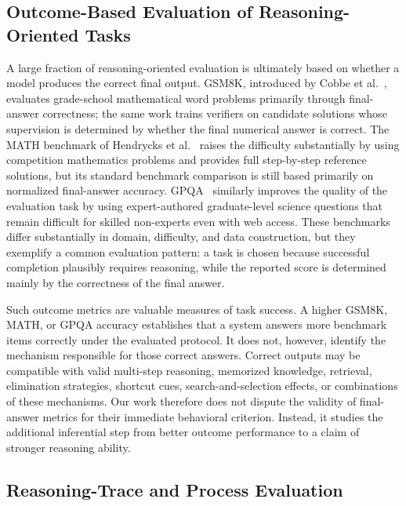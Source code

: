 \documentclass[acmsmall,screen,review,anonymous]{acmart}
\begin{document}
\subsection{Outcome-Based Evaluation of Reasoning-Oriented Tasks}
\label{sec:rw-outcome}

A large fraction of reasoning-oriented evaluation is ultimately based on
whether a model produces the correct final output. GSM8K, introduced by
Cobbe et al.~\cite{Cobbe2021GSM8K}, evaluates grade-school mathematical word
problems primarily through final-answer correctness; the same work trains
verifiers on candidate solutions whose supervision is determined by whether
the final numerical answer is correct. The MATH benchmark of Hendrycks et
al.~\cite{Hendrycks2021MATH} raises the difficulty substantially by using
competition mathematics problems and provides full step-by-step reference
solutions, but its standard benchmark comparison is still based primarily on
normalized final-answer accuracy. GPQA~\cite{Rein2024GPQA} similarly improves
the quality of the evaluation task by using expert-authored graduate-level
science questions that remain difficult for skilled non-experts even with web
access. These benchmarks differ substantially in domain, difficulty, and data
construction, but they exemplify a common evaluation pattern: a task is chosen
because successful completion plausibly requires reasoning, while the reported
score is determined mainly by the correctness of the final answer.

Such outcome metrics are valuable measures of task success. A higher GSM8K,
MATH, or GPQA accuracy establishes that a system answers more benchmark items
correctly under the evaluated protocol. It does not, however, identify the
mechanism responsible for those correct answers. Correct outputs may be
compatible with valid multi-step reasoning, memorized knowledge, retrieval,
elimination strategies, shortcut cues, search-and-selection effects, or
combinations of these mechanisms. Our work therefore does not dispute the
validity of final-answer metrics for their immediate behavioral criterion.
Instead, it studies the additional inferential step from better outcome
performance to a claim of stronger reasoning ability.


\subsection{Reasoning-Trace and Process Evaluation}
\label{sec:rw-trace}
\end{document}
